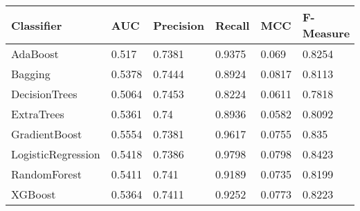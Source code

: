 \begin{tabular}{|p{3cm}p{1.2cm}p{1.2cm}p{1.2cm}p{1.2cm}p{1.5cm}|}
  \hline
Classifier & AUC & Precision & Recall & MCC & F-Measure \\ 
  \hline \hline
AdaBoost & 0.517 & 0.7381 & 0.9375 & 0.069 & 0.8254 \\ 
  Bagging & 0.5378 & 0.7444 & 0.8924 & 0.0817 & 0.8113 \\ 
  DecisionTrees & 0.5064 & 0.7453 & 0.8224 & 0.0611 & 0.7818 \\ 
  ExtraTrees & 0.5361 & 0.74 & 0.8936 & 0.0582 & 0.8092 \\ 
  GradientBoost & 0.5554 & 0.7381 & 0.9617 & 0.0755 & 0.835 \\ 
  LogisticRegression & 0.5418 & 0.7386 & 0.9798 & 0.0798 & 0.8423 \\ 
  RandomForest & 0.5411 & 0.741 & 0.9189 & 0.0735 & 0.8199 \\ 
  XGBoost & 0.5364 & 0.7411 & 0.9252 & 0.0773 & 0.8223 \\ 
   \hline
\end{tabular}
